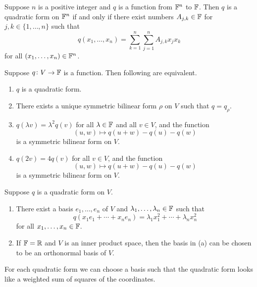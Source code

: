 \documentclass{extarticle}
\begin{document}
\begin{corollary}
    Suppose \(n\) is a positive integer and \(q\) is a function from \(\mathbb{F}^n\) to \(\mathbb{F}\). Then \(q\) is a 
    quadratic form on \(\mathbb{F}^n\) if and only if there exist numbers \(A_{j, k} \in \mathbb{F}\) for \(j, k \in \{1, \ldots, n\}\)
    such that 
    \[q(x_1, \ldots, x_n)  = \sum_{k=1}^{n} \sum_{j=1}^{n} A_{j, k} x_j x_k\]
    for all \((x_1, \ldots, x_n) \in \mathbb{F}^n\). 
\end{corollary}

\begin{thm}
    Suppose \(q \colon V \to \mathbb{F}\) is a function. Then following are equivalent. 
    \begin{enumerate}[label=(\alph*)]
        \item \(q\) is a quadratic form. 
        \item There exists a unique symmetric bilinear form \(\rho\) on \(V\) such that \(q = q_\rho\). 
        \item \(q(\lambda v) = \lambda^2 q(v)\) for all \(\lambda \in \mathbb{F}\) and all \(v \in V\), and the function 
        \[(u, w) \mapsto q(u + w) - q(u) - q(w)\]
        is a symmetric bilinear form on \(V\). 

        \item \(q(2v) = 4 q(v)\) for all \(v \in V\), and the function 
        \[(u, w) \mapsto q(u + w) - q(u) - q(w)\]
        is a symmetric bilinear form on \(V\). 
    \end{enumerate}
\end{thm}

\begin{thm}
    Suppose \(q\) is a quadratic form on \(V\). 
    \begin{enumerate}[label=(\alph*)]
        \item There exist a basis \(e_1, \ldots, e_n\) of \(V\) and \(\lambda_1, \ldots, \lambda_n \in \mathbb{F}\) 
        such that 
        \[q(x_1 e_1 + \cdots + x_n e_n) = \lambda_1 x_1^2 + \cdots + \lambda_n x_n^2\]
        for all \(x_1, \ldots, x_n \in \mathbb{F}\). 

        \item If \(\mathbb{F} = \mathbb{R}\) and \(V\) is an inner product space, then the basis in (a) can be chosen to be 
        an orthonormal basis of \(V\). 
    \end{enumerate}
\end{thm}

\begin{remark}
    For each quadratic form we can choose a basis such that the quadratic form looks like a weighted sum of 
    squares of the coordinates. 
\end{remark}
\end{document}
